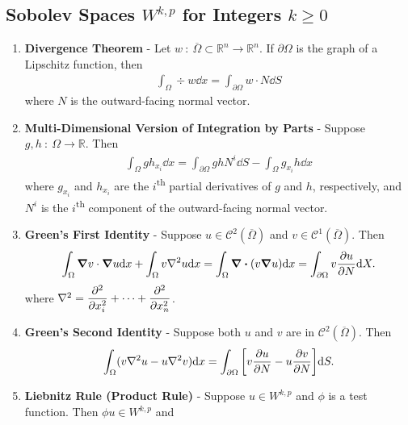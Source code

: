 \documentclass{article}
\newcommand{\Rl}{\mathbb{R}}
\begin{document}
    \subsection{Sobolev Spaces $W^{k,p}$ for Integers $k \geq 0$}
    \begin{enumerate}
        \item
            \textbf{Divergence Theorem} - Let $w\ :\ \overline{\Omega} \subset \Rl^n \rightarrow \Rl^n$.  If $\partial\Omega$ is the graph of a Lipschitz function, then
            \begin{align*}
                \int_\Omega \div w \dd x = \int_{\partial \Omega} w \cdot N \dd S
            \end{align*}
            where $N$ is the outward-facing normal vector.
        \item
            \textbf{Multi-Dimensional Version of Integration by Parts} - Suppose $g,h\ :\ \Omega \rightarrow \Rl$.  Then
            \begin{align*}
                \int_\Omega g h_{x_i} \dd x = \int_{\partial\Omega} gh N^i \dd S - \int_\Omega g_{x_i}h \dd x
            \end{align*}
            where $g_{x_i}$ and $h_{x_i}$ are the $i$\textsuperscript{th} partial derivatives of $g$ and $h$, respectively, and $N^i$ is the $i$\textsuperscript{th} component of the outward-facing normal vector.
        \item
            \textbf{Green's First Identity} - Suppose $u \in \mathcal{C}^2(\overline{\Omega})$ and $v \in \mathcal{C}^1(\overline{\Omega})$.  Then
            \begin{align*}
                \int_\Omega \grad v \cdot \grad u \dd x + \int_\Omega v \laplacian u \dd x = \int_\Omega \div\qty(v\grad u) \dd x = \int_{\partial\Omega} v \frac{\partial u}{\partial N}\dd X.
            \end{align*}
            where $\laplacian = \dfrac{\partial^2}{\partial x_i^2} + \dots + \dfrac{\partial^2}{\partial x_n^2}$.
        \item
            \textbf{Green's Second Identity} - Suppose both $u$ and $v$ are in $\mathcal{C}^2(\overline{\Omega})$.  Then
            \begin{align*}
                \int_\Omega (v \laplacian u - u \laplacian v) \dd x = \int_{\partial \Omega} \qty[v \frac{\partial u}{\partial N} - u \frac{\partial v}{\partial N}]\dd S.
            \end{align*}
        \item
            \textbf{Liebnitz Rule (Product Rule)} - Suppose $u \in W^{k,p}$ and $\phi$ is a test function.  Then $\phi u \in W^{k,p}$ and

\end{enumerate}
\end{document}

